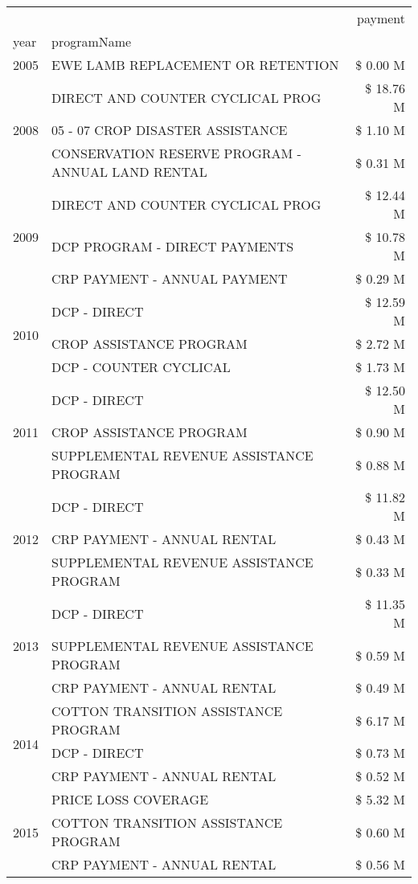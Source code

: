 \begin{tabular}{llr}
\toprule
 &  & payment \\
year & programName &  \\
\midrule
2005 & EWE LAMB REPLACEMENT OR RETENTION & \$ 0.00 M \\
\cline{1-3}
\multirow[t]{3}{*}{2008} & DIRECT AND COUNTER CYCLICAL PROG & \$ 18.76 M \\
 & 05 - 07 CROP DISASTER ASSISTANCE & \$ 1.10 M \\
 & CONSERVATION RESERVE PROGRAM - ANNUAL LAND RENTAL & \$ 0.31 M \\
\cline{1-3}
\multirow[t]{3}{*}{2009} & DIRECT AND COUNTER CYCLICAL PROG & \$ 12.44 M \\
 & DCP PROGRAM - DIRECT PAYMENTS & \$ 10.78 M \\
 & CRP PAYMENT - ANNUAL PAYMENT & \$ 0.29 M \\
\cline{1-3}
\multirow[t]{3}{*}{2010} & DCP - DIRECT & \$ 12.59 M \\
 & CROP ASSISTANCE PROGRAM & \$ 2.72 M \\
 & DCP - COUNTER CYCLICAL & \$ 1.73 M \\
\cline{1-3}
\multirow[t]{3}{*}{2011} & DCP - DIRECT & \$ 12.50 M \\
 & CROP ASSISTANCE PROGRAM & \$ 0.90 M \\
 & SUPPLEMENTAL REVENUE ASSISTANCE PROGRAM & \$ 0.88 M \\
\cline{1-3}
\multirow[t]{3}{*}{2012} & DCP - DIRECT & \$ 11.82 M \\
 & CRP PAYMENT - ANNUAL RENTAL & \$ 0.43 M \\
 & SUPPLEMENTAL REVENUE ASSISTANCE PROGRAM & \$ 0.33 M \\
\cline{1-3}
\multirow[t]{3}{*}{2013} & DCP - DIRECT & \$ 11.35 M \\
 & SUPPLEMENTAL REVENUE ASSISTANCE PROGRAM & \$ 0.59 M \\
 & CRP PAYMENT - ANNUAL RENTAL & \$ 0.49 M \\
\cline{1-3}
\multirow[t]{3}{*}{2014} & COTTON TRANSITION ASSISTANCE PROGRAM & \$ 6.17 M \\
 & DCP - DIRECT & \$ 0.73 M \\
 & CRP PAYMENT - ANNUAL RENTAL & \$ 0.52 M \\
\cline{1-3}
\multirow[t]{3}{*}{2015} & PRICE LOSS COVERAGE & \$ 5.32 M \\
 & COTTON TRANSITION ASSISTANCE PROGRAM & \$ 0.60 M \\
 & CRP PAYMENT - ANNUAL RENTAL & \$ 0.56 M \\

\end{tabular}
